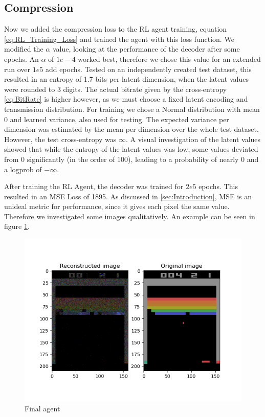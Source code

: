 \subsection{Compression}\label{sub:Results_Compression}
Now we added the compression loss to the RL agent training, equation
\ref{eq:RL_Training_Loss} and trained the agent with this loss function. We
modified the $\alpha$ value, looking at the performance of the decoder after some epochs. An $\alpha$
of $1e-4$ worked best, therefore we chose this value for an extended run over $1e5$ add epochs. Tested on an independently created test
dataset, this resulted in an entropy of 1.7 bits per latent dimension, when the
latent values were rounded to 3 digits. The actual bitrate given by the
cross-entropy \ref{eq:BitRate} is higher however, as we must choose a
fixed latent encoding and transmission distribution. For training we chose a Normal distribution with mean 0 and learned variance, also used for testing. The expected variance per dimension was estimated by the mean
per dimension over the whole test dataset. However, the test cross-entropy was $\infty$. A visual investigation of the latent values showed
that while the entropy of the latent values was low, some values deviated from 0 significantly (in the order of 100), leading to a probability of nearly
0 and a logprob of $-\infty$.

After training the RL Agent, the decoder was trained for $2e5$ epochs. This
resulted in an MSE Loss of 1895. As discussed in \ref{sec:Introduction}, MSE
is an unideal metric for performance, since it gives each pixel the same
value. Therefore we investigated some images qualitatively. An example can be seen in figure
\ref{fig:final_agent}.
\begin{figure}[H]
    \centering
    \includegraphics[width=\linewidth]{images/orig_reconstructed_final_agent.png}
    \caption{Final agent}
    \label{fig:final_agent}
\end{figure}

